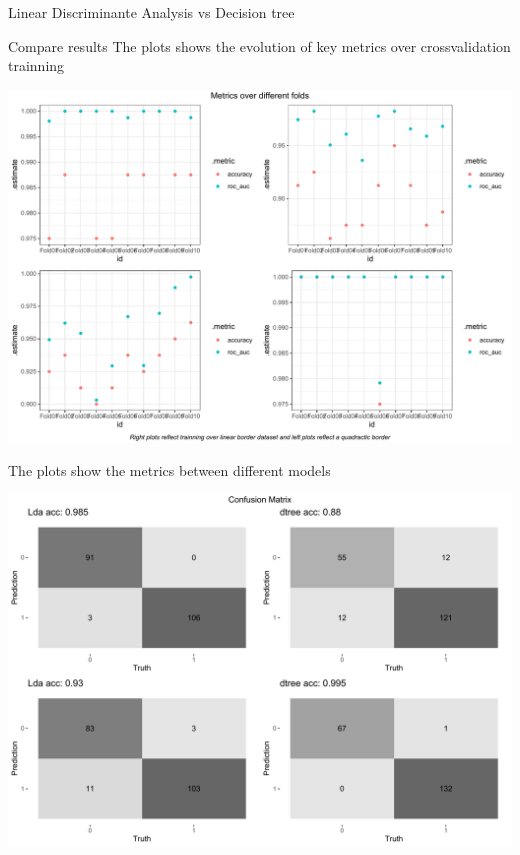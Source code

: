 \documentclass[
  ignorenonframetext,
]{article}
\begin{document}
\begin{frame}[fragile]{Linear Discriminante Analysis vs Decision tree}
\begin{block}{Compare results}
The plots shows the evolution of key metrics over crossvalidation trainning

\begin{center}\includegraphics{_main_files/figure-beamer/unnamed-chunk-29-1} \end{center}

The plots show the metrics between different models

\begin{center}\includegraphics{_main_files/figure-beamer/unnamed-chunk-30-1} \end{center}


\end{block}
\end{frame}
\end{document}
